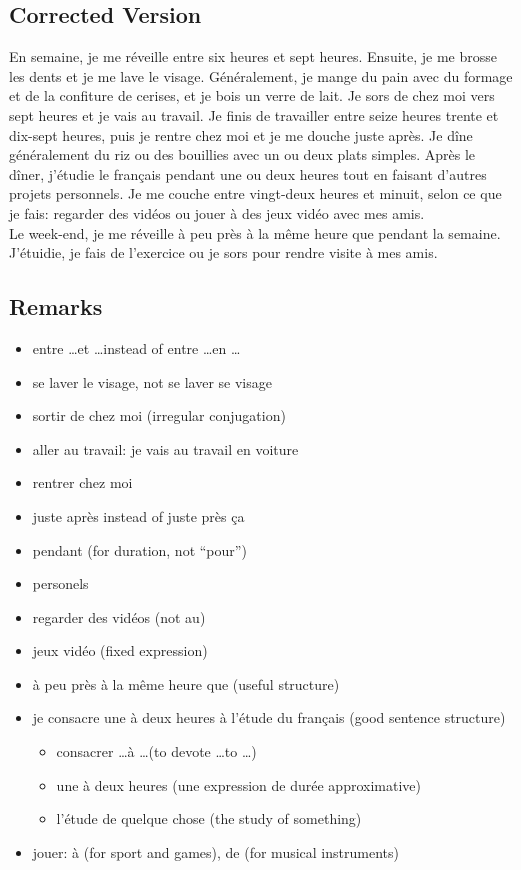 \documentclass{book}
\begin{document}
    \subsection*{Corrected Version}
        En semaine, je me réveille entre six heures et sept heures.
        Ensuite, je me brosse les dents et je me lave le visage.
        Généralement, je mange du pain avec du formage et de la confiture de cerises, et je bois un verre de lait.
        Je sors de chez moi vers sept heures et je vais au travail.
        Je finis de travailler entre seize heures trente et dix-sept heures, puis je rentre chez moi et je me douche juste après.
        Je dîne généralement du riz ou des bouillies avec un ou deux plats simples. 
        Après le dîner, j'étudie le français pendant une ou deux heures tout en faisant d'autres projets personnels.
        Je me couche entre vingt-deux heures et minuit, selon ce que je fais: regarder des vidéos ou jouer à des jeux vidéo avec mes amis.
        \\
        Le week-end, je me réveille à peu près à la même heure que pendant la semaine. J'étuidie, je fais de l'exercice ou je sors pour rendre visite à mes amis.

    \subsection*{Remarks}
        \begin{itemize}
            \item entre \dots et \dots instead of entre \dots en \dots
            \item se laver le visage, not se laver se visage
            \item sortir de chez moi (irregular conjugation)
            \item aller au travail: je vais au travail en voiture
            \item rentrer chez moi
            \item juste après instead of juste près ça
            \item pendant (for duration, not ``pour'')
            \item personels 
            \item regarder des vidéos (not au)
            \item jeux vidéo (fixed expression)
            \item à peu près à la même heure que (useful structure)
            \item je consacre une à deux heures à l'étude du français (good sentence structure)
            \begin{itemize}
                \item consacrer \dots à \dots (to devote \dots to \dots)
                \item une à deux heures (une expression de durée approximative)
                \item l'étude de quelque chose (the study of something)
            \end{itemize}
            \item jouer: à (for sport and games), de (for musical instruments)
        \end{itemize}
\end{document}
